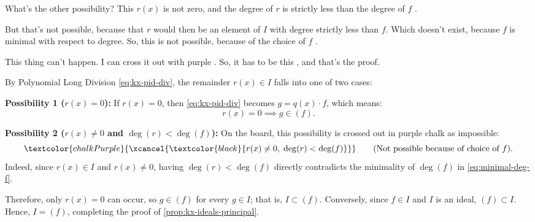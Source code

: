 \begin{proofWrapper}
\begin{speech}[00:35:16 - 00:36:27]
What's the other possibility? This $r(x)$ is not zero, and the degree of $r$ is strictly less than the degree of $f$ .

But that's not possible, because that $r$ would then be an element of $I$ with degree strictly less than $f$. Which doesn't exist, because $f$ is minimal with respect to degree. So, this is not possible, because of the choice of $f$ .

This thing can't happen. I can cross it out with purple . So, it has to be this , and that's the proof.
\end{speech}

\begin{content}[Analyzing the Remainder and Concluding \texorpdfstring{$I = (f)$}{I = (f)}]
By Polynomial Long Division \eqref{eq:kx-pid-div}, the remainder $r(x) \in I$ falls into one of two cases:

\textbf{Possibility 1 ($r(x) = 0$):} If $r(x) = 0$, then \eqref{eq:kx-pid-div} becomes $g = q(x) \cdot f$, which means:
\[
r(x) = 0 \implies g \in (f).
\]

\textbf{Possibility 2 ($r(x) \neq 0$ and $\deg(r) < \deg(f)$):} On the board, this possibility is crossed out in purple chalk as impossible:
\[
\textcolor{chalkPurple}{\xcancel{\textcolor{black}{r(x) \neq 0,\; \deg(r) < \deg(f)}}} \qquad \text{(Not possible because of choice of $f$).}
\]
Indeed, since $r(x) \in I$ and $r(x) \neq 0$, having $\deg(r) < \deg(f)$ directly contradicts the minimality of $\deg(f)$ in \eqref{eq:minimal-deg-f}.

Therefore, only $r(x) = 0$ can occur, so $g \in (f)$ for every $g \in I$; that is, $I \subset (f)$. Conversely, since $f \in I$ and $I$ is an ideal, $(f) \subset I$. Hence, $I = (f)$, completing the proof of \cref{prop:kx-ideals-principal}.


\end{content}
\end{proofWrapper}
